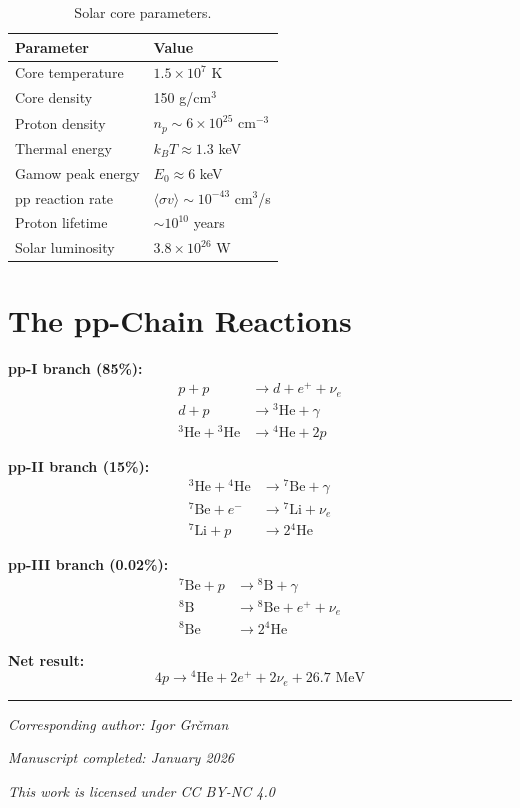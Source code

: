 \documentclass[12pt,a4paper]{article}
\begin{document}
\begin{table}[H]
\centering
\begin{tabular}{@{}ll@{}}
\toprule
\textbf{Parameter} & \textbf{Value} \\
\midrule
Core temperature & $1.5 \times 10^7$ K \\
Core density & 150 g/cm$^3$ \\
Proton density & $n_p \sim 6 \times 10^{25}$ cm$^{-3}$ \\
Thermal energy & $k_BT \approx 1.3$ keV \\
Gamow peak energy & $E_0 \approx 6$ keV \\
pp reaction rate & $\langle\sigma v\rangle \sim 10^{-43}$ cm$^3$/s \\
Proton lifetime & $\sim 10^{10}$ years \\
Solar luminosity & $3.8 \times 10^{26}$ W \\
\bottomrule
\end{tabular}
\caption{Solar core parameters.}
\end{table}

\section{The pp-Chain Reactions}

\textbf{pp-I branch (85\%):}
\begin{align}
p + p &\to d + e^+ + \nu_e \\
d + p &\to {^3\text{He}} + \gamma \\
{^3\text{He}} + {^3\text{He}} &\to {^4\text{He}} + 2p
\end{align}

\textbf{pp-II branch (15\%):}
\begin{align}
{^3\text{He}} + {^4\text{He}} &\to {^7\text{Be}} + \gamma \\
{^7\text{Be}} + e^- &\to {^7\text{Li}} + \nu_e \\
{^7\text{Li}} + p &\to 2{^4\text{He}}
\end{align}

\textbf{pp-III branch (0.02\%):}
\begin{align}
{^7\text{Be}} + p &\to {^8\text{B}} + \gamma \\
{^8\text{B}} &\to {^8\text{Be}} + e^+ + \nu_e \\
{^8\text{Be}} &\to 2{^4\text{He}}
\end{align}

\textbf{Net result:}
\begin{equation}
4p \to {^4\text{He}} + 2e^+ + 2\nu_e + 26.7 \text{ MeV}
\end{equation}

\vspace{1cm}
\hrule
\vspace{0.5cm}

\noindent\textit{Corresponding author: Igor Grčman}

\noindent\textit{Manuscript completed: January 2026}

\noindent\textit{This work is licensed under CC BY-NC 4.0}
\end{document}

